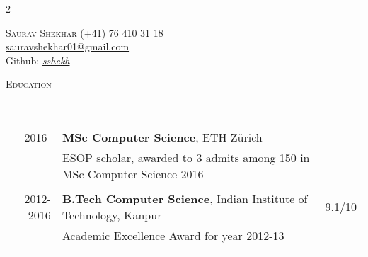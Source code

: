 \documentclass[9pt]{article}
\renewcommand{\arraystretch}{1.5}
\newenvironment{changemargin}[2]{%
  \begin{list}{}{%
    \setlength{\topsep}{0pt}%
    \setlength{\leftmargin}{#1}%
    \setlength{\rightmargin}{#2}%
    \setlength{\listparindent}{\parindent}%
    \setlength{\itemindent}{\parindent}%
    \setlength{\parsep}{\parskip}%
  }%
  \item[]}{\end{list}
}
\newcommand{\lineover}{
	\begin{changemargin}{-0.05in}{-0.10in}
		\vspace*{-9pt}
		\hrulefill \\
		\vspace*{-2pt}
	\end{changemargin}
}
\newcommand{\header}[1]{
	\begin{changemargin}{-0.5in}{-0.5in}
		\scshape{#1}\\
  	\lineover
	\end{changemargin}
}
\newcommand{\name}[1]{
	  	{\LARGE \scshape {#1}}
}
\newcommand{\contact}[4]{
	\begin{changemargin}{-0.65in}{-0.65in}
		\begin{multicols}{2}
			\name{{#1}}\vfill\null %
			\columnbreak
			{#2}\\	
			{#3}\\ 
			{#4}\\ 
		\end{multicols}
	\end{changemargin}
}
\begin{document}
\contact{Saurav Shekhar}
{{\hspace{172pt}}(+41) 76 410 31 18}
{{\hspace{130pt}} \href{mailto:sauravshekhar01@gmail.com}{sauravshekhar01@gmail.com}}
{\hspace{190pt}Github: \href{http://github.com/sshekh}{\emph{{\textit{sshekh}}}}}
 
\header{Education}

\vspace{4pt}
	\renewcommand{\arraystretch}{1}
	\begin{tabular}{rll}
	2016- & \textbf{MSc Computer Science},  ETH Z{\"u}rich  &- \\
		  & ESOP scholar, awarded to 3 admits among 150 in MSc Computer Science 2016 &\\\\
2012-2016 & \textbf{B.Tech Computer Science},  Indian Institute of Technology, Kanpur & 9.1/10 \\ 
		  &  Academic Excellence Award for year 2012-13 & \\\\
	\end{tabular}

\end{document}
